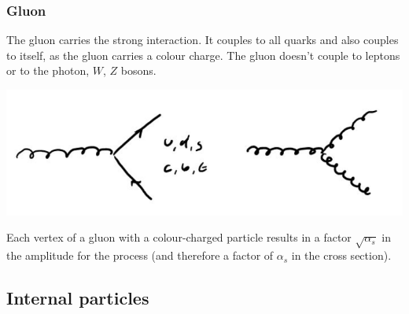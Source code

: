 \documentclass[12pt]{article}
\begin{document}
\subsubsection{Gluon}
The gluon carries the strong interaction. It couples to all quarks and also couples to itself, as the gluon carries a colour charge. The gluon doesn't couple to leptons or to the photon, $W$, $Z$ bosons.
\begin{center}
\includegraphics[scale=0.4]{images/gluon.png}
\end{center}
Each vertex of a gluon with a colour-charged particle results in a factor $\sqrt{\alpha_s}$ in the amplitude for the process (and therefore a factor of $\alpha_s$ in the cross section).

\subsection{Internal particles}
\end{document}
